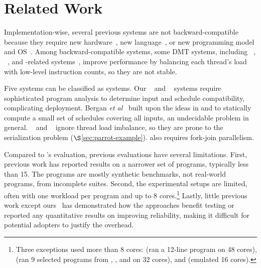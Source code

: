 \vspace{-.02in}
\section{Related Work} \label{sec:parrot-related}
\vspace{-.02in}


 Implementation-wise, several previous systems are 
not backward-compatible because they require new hardware~\cite{dmp:asplos09}, 
new language~\cite{dpj:oopsla09}, or new programming model and
OS~\cite{determinator:osdi10}.  Among backward-compatible systems, some
DMT systems, including \kendo~\cite{kendo:asplos09},
\coredet~\cite{coredet:asplos10}, and \coredet-related
systems~\cite{dos:osdi10, ddos:asplos13}, improve performance by balancing
each thread's load with low-level instruction counts, so they are not
stable.

Five systems can be classified as \smt systems.  Our
\tern~\cite{cui:tern:osdi10} and \peregrine~\cite{peregrine:sosp11} systems
require sophisticated program analysis to determine input and schedule
compatibility, complicating deployment. Bergan {\it et
  al}~\cite{bergan:oopsla13} built upon the ideas in \tern and \peregrine
to statically compute a small set of schedules covering all inputs, an
undecidable problem in general.  \grace~\cite{grace:oopsla09} and 
\dthreads~\cite{dthreads:sosp11} ignore thread load
imbalance, so they are prone to the serialization problem
($\S$\ref{sec:parrot-example}). \grace also requires
fork-join parallelism.

Compared to \parrot's evaluation, previous evaluations have several limitations.
First, previous work has reported results on a narrower set of programs,
typically less than 15.  The programs are mostly synthetic benchmarks, not
real-world programs, from incomplete suites.  Second, the experimental
setups are limited, often with one workload per program and up to 8
cores.\footnote{Three exceptions used more than 8 cores:
  \cite{kendo:wodet11} (ran a 12-line program on 48 cores),
  \cite{aviram:thesis} (ran 9 selected programs from \parsec, \splashx, and
  \npb on 32 cores), and \cite{dmp:asplos09} (emulated 16 cores).} Lastly, 
little previous work except ours~\cite{cui:tern:osdi10, peregrine:sosp11, 
wu:pldi12} has demonstrated how the approaches benefit testing or reported any 
quantitative results on improving reliability, making it difficult for potential 
adopters to justify the overhead.

